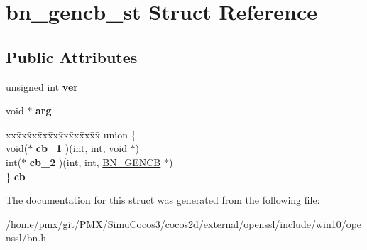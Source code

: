 \hypertarget{structbn__gencb__st}{}\section{bn\+\_\+gencb\+\_\+st Struct Reference}
\label{structbn__gencb__st}
\subsection*{Public Attributes}
\begin{DoxyCompactItemize}
\item 
\mbox{\label{structbn__gencb__st_a1c1ac893bd1f6ea3fcfa831fda085086}} 
unsigned int {\bfseries ver}
\item 
\mbox{\label{structbn__gencb__st_a96626e1280d969f4848829c2713f22a7}} 
void $\ast$ {\bfseries arg}
\item 
\mbox{\label{structbn__gencb__st_a6dbeb1d04121a88d8b07661d518ccecc}} 
\begin{tabbing}
xx\=xx\=xx\=xx\=xx\=xx\=xx\=xx\=xx\=\kill
union \{\\
\>void($\ast$ {\bfseries cb\_1} )(int, int, void $\ast$)\\
\>int($\ast$ {\bfseries cb\_2} )(int, int, \hyperlink{structbn__gencb__st}{BN\_GENCB} $\ast$)\\
\} {\bfseries cb}\\

\end{tabbing}\end{DoxyCompactItemize}


The documentation for this struct was generated from the following file\+:\begin{DoxyCompactItemize}
\item 
/home/pmx/git/\+P\+M\+X/\+Simu\+Cocos3/cocos2d/external/openssl/include/win10/openssl/bn.\+h\end{DoxyCompactItemize}
